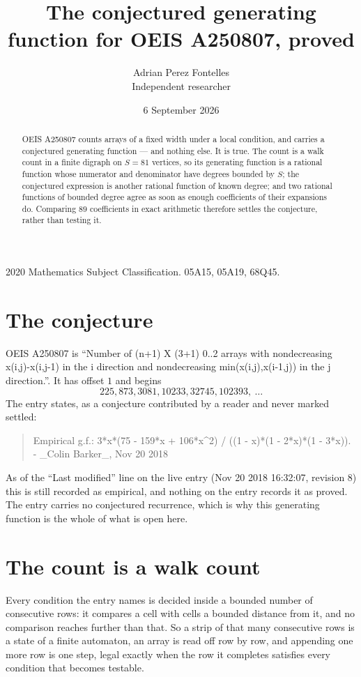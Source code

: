 \documentclass[11pt,a4paper]{article}
\title{The conjectured generating function for OEIS A250807, proved}
\author{Adrian Perez Fontelles\\ \small Independent researcher}
\date{6 September 2026}
\theoremstyle{plain}
\theoremstyle{definition}
\begin{document}
\maketitle

\begin{abstract}
OEIS A250807 counts arrays of a fixed width under a local condition, and carries a conjectured
generating function --- and nothing else. It is true. The count is a walk count in a finite
digraph on $S=81$ vertices, so its generating function is a rational function whose numerator
and denominator have degrees bounded by $S$; the conjectured expression is another rational
function of known degree; and two rational functions of bounded degree agree as soon as enough
coefficients of their expansions do. Comparing $89$ coefficients in exact arithmetic
therefore settles the conjecture, rather than testing it.
\end{abstract}

\noindent\small 2020 Mathematics Subject Classification. 05A15, 05A19, 68Q45.\normalsize

\section{The conjecture}

OEIS A250807 is ``Number of (n+1) X (3+1) 0..2 arrays with nondecreasing x(i,j)-x(i,j-1) in the i direction and nondecreasing min(x(i,j),x(i-1,j)) in the j direction.''. It has offset $1$ and begins
\[
225, 873, 3081, 10233, 32745, 102393,\ \dots
\]
The entry states, as a conjecture contributed by a reader and never marked settled:
\begin{quote}
Empirical g.f.: 3*x*(75 - 159*x + 106*x\^{}2) / ((1 - x)*(1 - 2*x)*(1 - 3*x)). - \_Colin Barker\_, Nov 20 2018
\end{quote}
As of the ``Last modified'' line on the live entry (Nov 20 2018 16:32:07, revision 8) this is still
recorded as empirical, and nothing on the entry records it as proved. The entry carries no
conjectured recurrence, which is why this generating function is the whole of what is open
here.

\section{The count is a walk count}

Every condition the entry names is decided inside a bounded number of consecutive rows: it
compares a cell with cells a bounded distance from it, and no comparison reaches further than
that. So a strip of that many consecutive rows is a state of a finite automaton, an array is
read off row by row, and appending one more row is one step, legal exactly when the row it
completes satisfies every condition that becomes testable.
\end{document}
